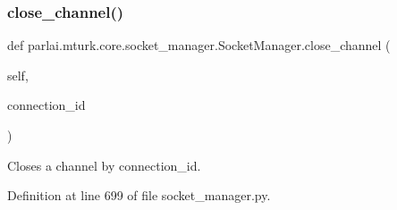 \subsubsection{\texorpdfstring{close\+\_\+channel()}{close\_channel()}}
{\footnotesize\ttfamily def parlai.\+mturk.\+core.\+socket\+\_\+manager.\+Socket\+Manager.\+close\+\_\+channel (\begin{DoxyParamCaption}\item[{}]{self,  }\item[{}]{connection\+\_\+id }\end{DoxyParamCaption})}

\begin{DoxyVerb}Closes a channel by connection_id.
\end{DoxyVerb}
 

Definition at line 699 of file socket\+\_\+manager.\+py.


